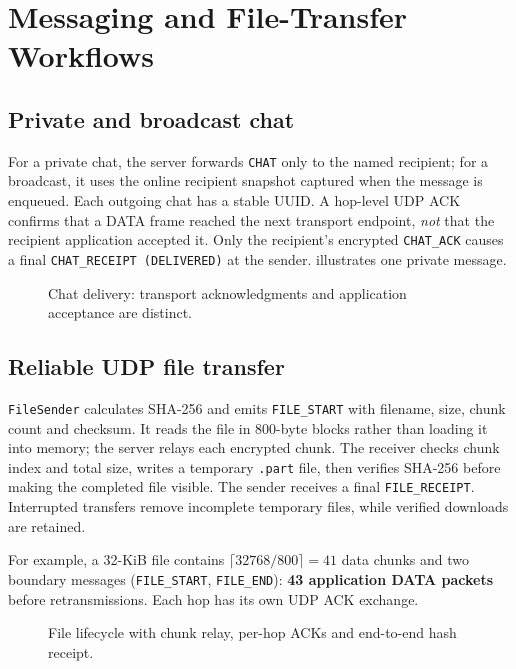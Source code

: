 \section{Messaging and File-Transfer Workflows}
\subsection{Private and broadcast chat}

For a private chat, the server forwards \texttt{CHAT} only to the named recipient; for a broadcast, it uses the online recipient snapshot captured when the message is enqueued. Each outgoing chat has a stable UUID. A hop-level UDP ACK confirms that a DATA frame reached the next transport endpoint, \emph{not} that the recipient application accepted it. Only the recipient's encrypted \texttt{CHAT\_ACK} causes a final \texttt{CHAT\_RECEIPT (DELIVERED)} at the sender.  illustrates one private message.

\begin{figure}[H]
\centering
\caption{Chat delivery: transport acknowledgments and application acceptance are distinct.}
\label{fig:chatseq}
\end{figure}

\subsection{Reliable UDP file transfer}

\texttt{FileSender} calculates SHA-256 and emits \texttt{FILE\_START} with filename, size, chunk count and checksum. It reads the file in 800-byte blocks rather than loading it into memory; the server relays each encrypted chunk. The receiver checks chunk index and total size, writes a temporary \texttt{.part} file, then verifies SHA-256 before making the completed file visible. The sender receives a final \texttt{FILE\_RECEIPT}. Interrupted transfers remove incomplete temporary files, while verified downloads are retained.

For example, a 32-KiB file contains \(\lceil 32768/800\rceil=41\) data chunks and two boundary messages (\texttt{FILE\_START}, \texttt{FILE\_END}): \textbf{43 application DATA packets} before retransmissions. Each hop has its own UDP ACK exchange.

\begin{figure}[H]
\centering
\caption{File lifecycle with chunk relay, per-hop ACKs and end-to-end hash receipt.}
\label{fig:fileseq}
\end{figure}

